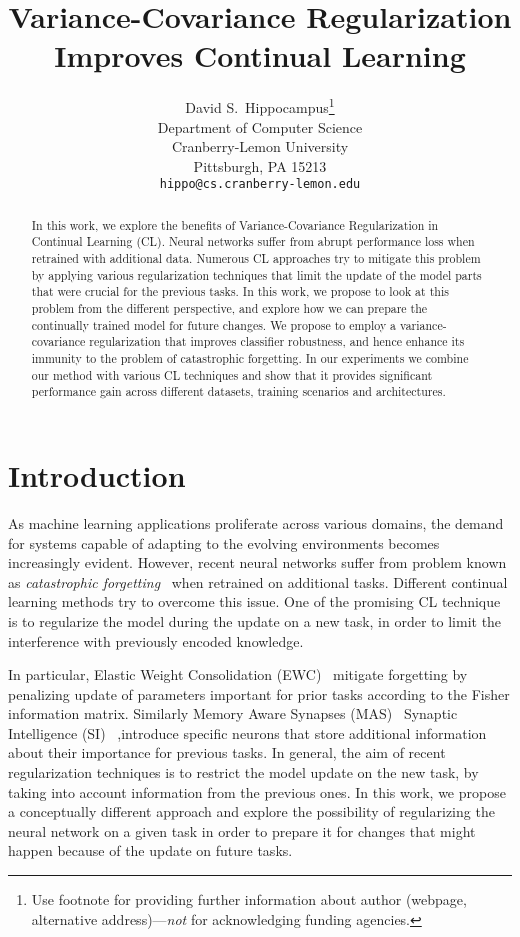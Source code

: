 \documentclass{article}
\title{Variance-Covariance Regularization Improves Continual Learning}
\author{%
  David S.~Hippocampus\thanks{Use footnote for providing further information
    about author (webpage, alternative address)---\emph{not} for acknowledging
    funding agencies.} \\
  Department of Computer Science\\
  Cranberry-Lemon University\\
  Pittsburgh, PA 15213 \\
  \texttt{hippo@cs.cranberry-lemon.edu} \\
}
\begin{document}
\maketitle


\begin{abstract}
  In this work, we explore the benefits of Variance-Covariance Regularization in Continual Learning (CL). Neural networks suffer from abrupt performance loss when retrained with additional data. Numerous CL approaches try to mitigate this problem by applying various regularization techniques that limit the update of the model parts that were crucial for the previous tasks. In this work, we propose to look at this problem from the different perspective, and explore how we can prepare the continually trained model for future changes. We propose to employ a variance-covariance regularization that improves classifier robustness, and hence enhance its immunity to the problem of catastrophic forgetting. In our experiments we combine our method with various CL techniques and show that it provides significant performance gain across different datasets, training scenarios and architectures.
\end{abstract}


\section{Introduction}

As machine learning applications proliferate across various domains, the demand for systems capable of adapting to the evolving environments becomes increasingly evident. However, recent neural networks suffer from problem known as \emph{catastrophic forgetting}~\cite{1999french} when retrained on additional tasks. Different continual learning methods try to overcome this issue. One of the promising CL technique is to regularize the model during the update on a new task, in order to limit the interference with previously encoded knowledge. 

In particular, Elastic Weight Consolidation (EWC)~\cite{kirkpatrick2017overcoming} mitigate forgetting by penalizing update of parameters important for prior tasks according to the Fisher information matrix. Similarly Memory Aware Synapses (MAS)~\cite{aljundi2017memory} Synaptic Intelligence (SI)~\cite{zenke2017continual} ,introduce specific neurons that store additional information about their importance for previous tasks. In general, the aim of recent regularization techniques is to restrict the model update on the new task, by taking into account information from the previous ones. In this work, we propose a conceptually different approach and explore the possibility of regularizing the neural network on a given task in order to prepare it for changes that might happen because of the update on future tasks.
\end{document}
